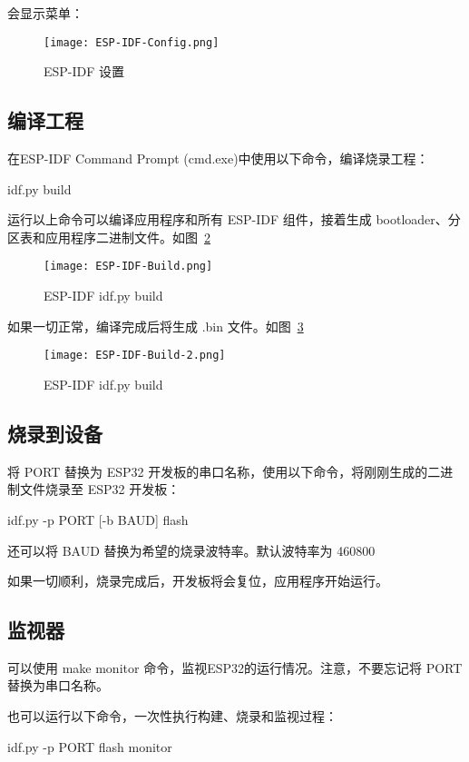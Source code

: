 会显示菜单：

\begin{figure}[htbp]
    \centering
    \texttt{[image: ESP-IDF-Config.png]}
    \caption{ESP-IDF 设置}
    \label{ESP-IDF-Config}
\end{figure}

\subsection{编译工程}

在ESP-IDF Command Prompt (cmd.exe)中使用以下命令，编译烧录工程：

\begin{tcolorbox}
    idf.py build
\end{tcolorbox}

运行以上命令可以编译应用程序和所有 ESP-IDF 组件，接着生成 bootloader、分区表和应用程序二进制文件。如图~\ref{fig:ESP-IDF-Build}

\begin{figure}[htbp]
    \centering
    \texttt{[image: ESP-IDF-Build.png]}
    \caption{ESP-IDF idf.py build}
    \label{fig:ESP-IDF-Build}
\end{figure}

如果一切正常，编译完成后将生成 .bin 文件。如图~\ref{fig:ESP-IDF-Build-2}

\begin{figure}[htbp]
    \centering
    \texttt{[image: ESP-IDF-Build-2.png]}
    \caption{ESP-IDF idf.py build}
    \label{fig:ESP-IDF-Build-2}
\end{figure}

\subsection{烧录到设备}

将 PORT 替换为 ESP32 开发板的串口名称，使用以下命令，将刚刚生成的二进制文件烧录至 ESP32 开发板：

\begin{tcolorbox}
    idf.py -p PORT [-b BAUD] flash
\end{tcolorbox}

还可以将 BAUD 替换为希望的烧录波特率。默认波特率为 460800

如果一切顺利，烧录完成后，开发板将会复位，应用程序开始运行。

\subsection{监视器}

可以使用 make monitor 命令，监视ESP32的运行情况。注意，不要忘记将 PORT 替换为串口名称。

也可以运行以下命令，一次性执行构建、烧录和监视过程：

\begin{tcolorbox}
    idf.py -p PORT flash monitor
\end{tcolorbox}
